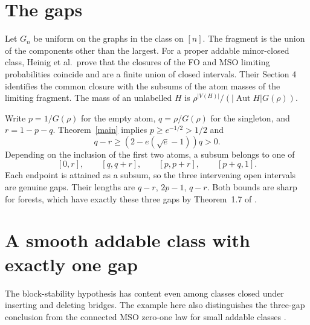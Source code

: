 \documentclass[11pt]{article}
\newcommand{\Aut}{\operatorname{Aut}}
\begin{document}
\section{The gaps}
Let $G_n$ be uniform on the graphs in the class on $[n]$. The fragment is the union of the components other than the largest. For a proper addable minor-closed class, Heinig et al.\ prove that the closures of the FO and MSO limiting probabilities coincide and are a finite union of closed intervals. Their Section 4 identifies the common closure with the subsums of the atom masses of the limiting fragment. The mass of an unlabelled $H$ is $\rho^{|V(H)|}/(|\Aut H|G(\rho))$.

Write $p=1/G(\rho)$ for the empty atom, $q=\rho/G(\rho)$ for the singleton, and $r=1-p-q$. Theorem~\ref{main} implies $p\ge e^{-1/2}>1/2$ and
\[
 q-r\ge (2-e(\sqrt e-1))q>0.
\]
Depending on the inclusion of the first two atoms, a subsum belongs to one of
\[
 [0,r],\qquad [q,q+r],\qquad [p,p+r],\qquad [p+q,1].
\]
Each endpoint is attained as a subsum, so the three intervening open intervals are genuine gaps. Their lengths are $q-r$, $2p-1$, $q-r$. Both bounds are sharp for forests, which have exactly these three gaps by Theorem~1.7 of \cite{hmnt}.

\section{A smooth addable class with exactly one gap}
The block-stability hypothesis has content even among classes closed under inserting and deleting bridges. The example here also distinguishes the three-gap conclusion from the connected MSO zero-one law for small addable classes \cite{dawar}.
\end{document}
